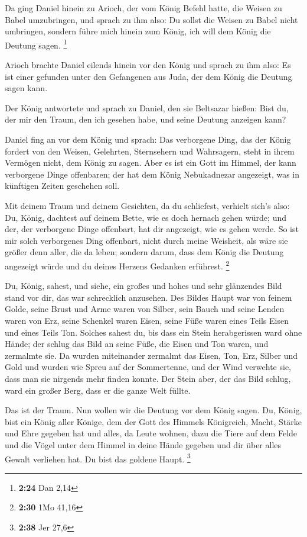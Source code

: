  Da ging Daniel hinein zu Arioch, der vom König Befehl
hatte, die Weisen zu Babel umzubringen, und sprach zu ihm also: Du
sollst die Weisen zu Babel nicht umbringen, sondern führe mich hinein
zum König, ich will dem König die Deutung sagen. \footnote{\textbf{2:24}
  Dan 2,14}

 Arioch brachte Daniel eilends hinein vor den König und
sprach zu ihm also: Es ist einer gefunden unter den Gefangenen aus Juda,
der dem König die Deutung sagen kann.

 Der König antwortete und sprach zu Daniel, den sie
Beltsazar hießen: Bist du, der mir den Traum, den ich gesehen habe, und
seine Deutung anzeigen kann?

 Daniel fing an vor dem König und sprach: Das verborgene
Ding, das der König fordert von den Weisen, Gelehrten, Sternsehern und
Wahrsagern, steht in ihrem Vermögen nicht, dem König zu sagen.
 Aber es ist ein Gott im Himmel, der kann verborgene Dinge
offenbaren; der hat dem König Nebukadnezar angezeigt, was in künftigen
Zeiten geschehen soll.

 Mit deinem Traum und deinem Gesichten, da du schliefest,
verhielt sich's also: Du, König, dachtest auf deinem Bette, wie es doch
hernach gehen würde; und der, der verborgene Dinge offenbart, hat dir
angezeigt, wie es gehen werde.  So ist mir solch
verborgenes Ding offenbart, nicht durch meine Weisheit, als wäre sie
größer denn aller, die da leben; sondern darum, dass dem König die
Deutung angezeigt würde und du deines Herzens Gedanken erführest.
\footnote{\textbf{2:30} 1Mo 41,16}

 Du, König, sahest, und siehe, ein großes und hohes und
sehr glänzendes Bild stand vor dir, das war schrecklich anzusehen.
 Des Bildes Haupt war von feinem Golde, seine Brust und
Arme waren von Silber, sein Bauch und seine Lenden waren von Erz,
 seine Schenkel waren Eisen, seine Füße waren eines Teils
Eisen und eines Teils Ton.  Solches sahest du, bis dass ein
Stein herabgerissen ward ohne Hände; der schlug das Bild an seine Füße,
die Eisen und Ton waren, und zermalmte sie.  Da wurden
miteinander zermalmt das Eisen, Ton, Erz, Silber und Gold und wurden wie
Spreu auf der Sommertenne, und der Wind verwehte sie, dass man sie
nirgends mehr finden konnte. Der Stein aber, der das Bild schlug, ward
ein großer Berg, dass er die ganze Welt füllte.

 Das ist der Traum. Nun wollen wir die Deutung vor dem
König sagen.  Du, König, bist ein König aller Könige, dem
der Gott des Himmels Königreich, Macht, Stärke und Ehre gegeben hat
 und alles, da Leute wohnen, dazu die Tiere auf dem Felde
und die Vögel unter dem Himmel in deine Hände gegeben und dir über alles
Gewalt verliehen hat. Du bist das goldene Haupt. \footnote{\textbf{2:38}
  Jer 27,6}


